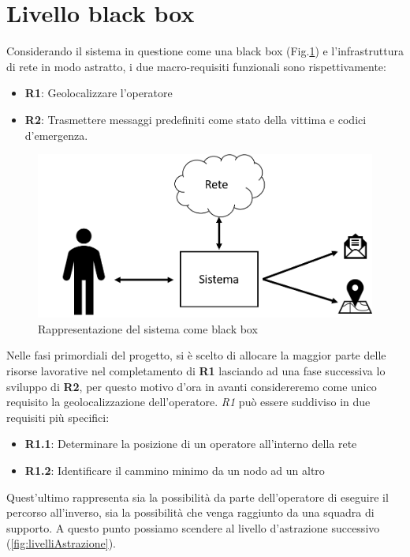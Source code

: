 \section{Livello black box}
Considerando il sistema in questione come una black box (Fig.\ref{fig:requisitiFunzionali}) e l'infrastruttura di rete in modo astratto, i due macro-requisiti funzionali  sono rispettivamente:
\begin{itemize}
	\item \textbf{R1}: Geolocalizzare l'operatore
	\item \textbf{R2}: Trasmettere messaggi predefiniti come stato della vittima e codici d'emergenza.
\end{itemize}
\begin{figure}[H]
	\centering
	\includegraphics[scale=0.3]{DescrizioneDelSistema/requisitiSistema.png}
	\caption{Rappresentazione del sistema come black box }
	\label{fig:requisitiFunzionali}
\end{figure}
Nelle fasi primordiali del progetto, si è scelto di allocare la maggior parte delle risorse lavorative nel completamento di \textbf{R1} lasciando ad una fase successiva lo sviluppo di \textbf{R2}, per questo motivo d'ora in avanti considereremo come unico requisito la geolocalizzazione dell'operatore. \textit{R1} può essere suddiviso in due requisiti più specifici:
\begin{itemize}
	\item \textbf{R1.1}: Determinare la posizione di un operatore all'interno della rete
	\item \textbf{R1.2}: Identificare il cammino minimo da un nodo ad un altro
\end{itemize}
Quest'ultimo rappresenta sia la possibilità da parte dell'operatore di eseguire il percorso all'inverso, sia la possibilità che venga raggiunto da una squadra di supporto. A questo punto possiamo scendere al livello d'astrazione successivo (\ref{fig:livelliAstrazione}).
\newpage 


